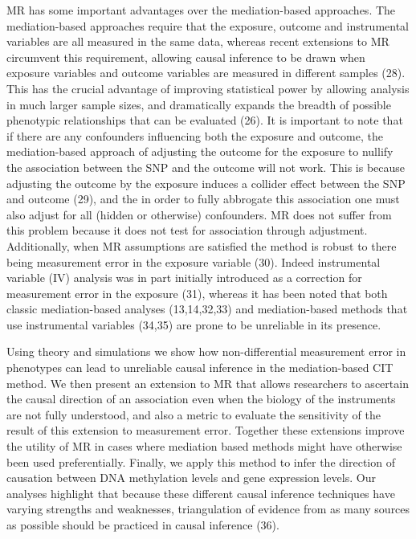 \documentclass[]{article}
\begin{document}
MR has some important advantages over the mediation-based approaches.
The mediation-based approaches require that the exposure, outcome and
instrumental variables are all measured in the same data, whereas recent
extensions to MR circumvent this requirement, allowing causal inference
to be drawn when exposure variables and outcome variables are measured
in different samples (28). This has the crucial advantage of improving
statistical power by allowing analysis in much larger sample sizes, and
dramatically expands the breadth of possible phenotypic relationships
that can be evaluated (26). It is important to note that if there are
any confounders influencing both the exposure and outcome, the
mediation-based approach of adjusting the outcome for the exposure to
nullify the association between the SNP and the outcome will not work.
This is because adjusting the outcome by the exposure induces a collider
effect between the SNP and outcome (29), and the in order to fully
abbrogate this association one must also adjust for all (hidden or
otherwise) confounders. MR does not suffer from this problem because it
does not test for association through adjustment. Additionally, when MR
assumptions are satisfied the method is robust to there being
measurement error in the exposure variable (30). Indeed instrumental
variable (IV) analysis was in part initially introduced as a correction
for measurement error in the exposure (31), whereas it has been noted
that both classic mediation-based analyses (13,14,32,33) and
mediation-based methods that use instrumental variables (34,35) are
prone to be unreliable in its presence.

Using theory and simulations we show how non-differential measurement
error in phenotypes can lead to unreliable causal inference in the
mediation-based CIT method. We then present an extension to MR that
allows researchers to ascertain the causal direction of an association
even when the biology of the instruments are not fully understood, and
also a metric to evaluate the sensitivity of the result of this
extension to measurement error. Together these extensions improve the
utility of MR in cases where mediation based methods might have
otherwise been used preferentially. Finally, we apply this method to
infer the direction of causation between DNA methylation levels and gene
expression levels. Our analyses highlight that because these different
causal inference techniques have varying strengths and weaknesses,
triangulation of evidence from as many sources as possible should be
practiced in causal inference (36).
\end{document}
